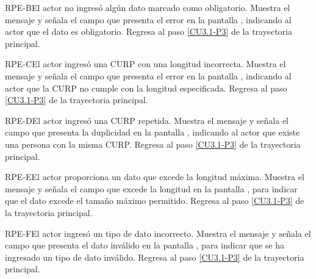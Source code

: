 
	\begin{UCtrayectoriaA}{RPE-B}{El actor no ingresó algún dato marcado como obligatorio.}
		\UCpaso[\UCsist] Muestra el mensaje  y señala el campo que presenta el error en la pantalla , indicando al actor que el dato es obligatorio.
		\UCpaso Regresa al paso \ref{CU3.1-P3} de la trayectoria principal.
	\end{UCtrayectoriaA}

	\begin{UCtrayectoriaA}{RPE-C}{El actor ingresó una CURP con una longitud incorrecta.}
		\UCpaso[\UCsist] Muestra el mensaje  y señala el campo que presenta el error en la pantalla , indicando al actor que la CURP no cumple con la longitud especificada.
		\UCpaso Regresa al paso \ref{CU3.1-P3} de la trayectoria principal.
	\end{UCtrayectoriaA}
	
	\begin{UCtrayectoriaA}{RPE-D}{El actor ingresó una CURP repetida.}
		\UCpaso[\UCsist] Muestra el mensaje  y señala el campo que presenta la duplicidad en la pantalla , indicando al actor que existe una persona con la misma CURP.
		\UCpaso Regresa al paso \ref{CU3.1-P3} de la trayectoria principal.
	\end{UCtrayectoriaA}

	\begin{UCtrayectoriaA}{RPE-E}{El actor proporciona un dato que excede la longitud máxima.}
		\UCpaso[\UCsist] Muestra el mensaje  y señala el campo que excede la longitud en la pantalla , para indicar que el dato excede el tamaño máximo permitido.
		\UCpaso Regresa al paso \ref{CU3.1-P3} de la trayectoria principal.
	\end{UCtrayectoriaA}

	\begin{UCtrayectoriaA}{RPE-F}{El actor ingresó un tipo de dato incorrecto.}
		\UCpaso[\UCsist] Muestra el mensaje  y señala el campo que presenta el dato inválido en la pantalla , para indicar que se ha ingresado un tipo de dato inválido.
		\UCpaso Regresa al paso \ref{CU3.1-P3} de la trayectoria principal.
	\end{UCtrayectoriaA}

